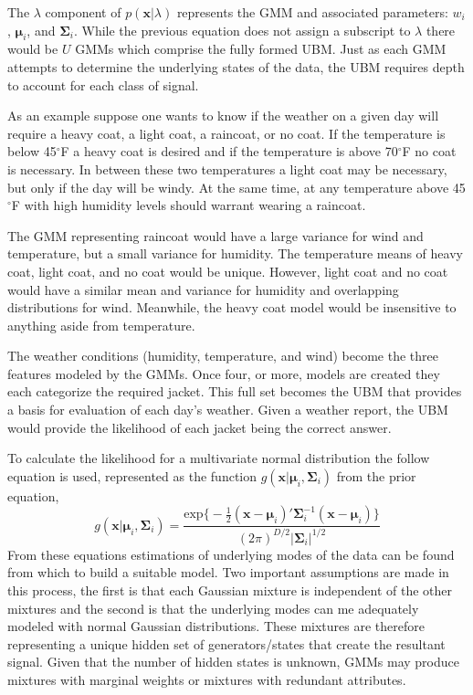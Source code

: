 The $\lambda$ component of $p(\bm{x}|\lambda)$ represents the \ac{GMM} and associated parameters: $w_{i}$, $\bm{\mu}_{i}$, and $\bm{\Sigma}_{i}$. While the previous equation does not assign a subscript to $\lambda$ there would be $U$ \acp{GMM} which comprise the fully formed \ac{UBM}. Just as each \ac{GMM} attempts to determine the underlying states of the data, the \ac{UBM} requires depth to account for each class of signal.

As an example suppose one wants to know if the weather on a given day will require a heavy coat, a light coat, a raincoat, or no coat. If the temperature is below 45$^\circ$F a heavy coat is desired and if the temperature is above 70$^\circ$F no coat is necessary. In between these two temperatures a light coat may be necessary, but only if the day will be windy. At the same time, at any temperature above 45$^\circ$F with high humidity levels should warrant wearing a raincoat.

The \ac{GMM} representing raincoat would have a large variance for wind and temperature, but a small variance for humidity. The temperature means of heavy coat, light coat, and no coat would be unique. However, light coat and no coat would have a similar mean and variance for humidity and overlapping distributions for wind. Meanwhile, the heavy coat model would be insensitive to anything aside from temperature.
 
The weather conditions (humidity, temperature, and wind) become the three features modeled by the \acp{GMM}. Once four, or more, models are created they each categorize the required jacket. This full set becomes the UBM that provides a basis for evaluation of each day's weather. Given a weather report, the UBM would provide the likelihood of each jacket being the correct answer.

To calculate the likelihood for a multivariate normal distribution the follow equation is used, represented as the function $g(\bm{x}|\mathbf{\mu}_{i},\bm{\Sigma}_{i})$ from the prior equation,
\begin{equation}
g(\bm{x}|\bm{\mu}_{i},\bm{\Sigma}_{i}) = \frac{\text{exp}\Big\{-\frac{1}{2}(\bm{x}-\bm{\mu}_{i})'\bm{\Sigma}_{i}^{-1}(\bm{x}-\bm{\mu}_{i})\Big\}}{(2\pi)^{D/2}\lvert\bm{\Sigma}_{i}\rvert^{1/2}}
\end{equation}
From these equations estimations of underlying modes of the data can be found from which to build a suitable model. Two important assumptions are made in this process, the first is that each Gaussian mixture is independent of the other mixtures and the second is that the underlying modes can me adequately modeled with normal Gaussian distributions. These mixtures are therefore representing a unique hidden set of generators/states that create the resultant signal. Given that the number of hidden states is unknown, GMMs may produce mixtures with marginal weights or mixtures with redundant attributes.

